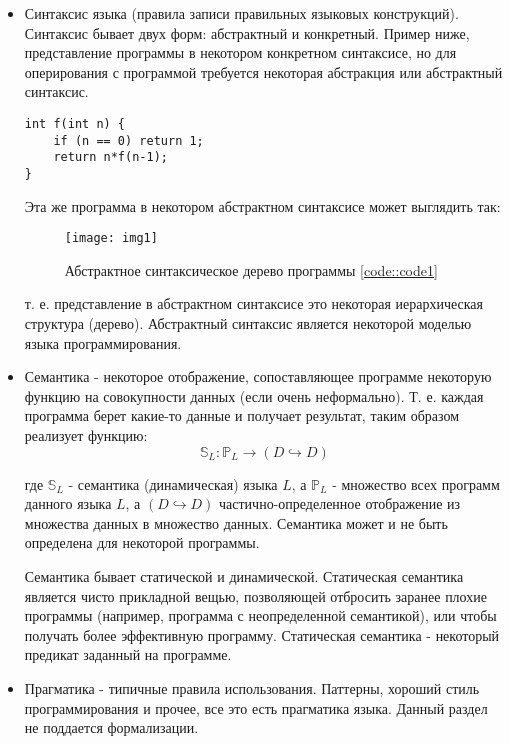 \begin{itemize}
\item Синтаксис языка (правила записи правильных языковых конструкций). Синтаксис бывает двух форм: абстрактный и конкретный. Пример ниже, представление программы в
некотором конкретном синтаксисе, но для оперирования с программой требуется некоторая абстракция или абстрактный синтаксис.

\begin{lstlisting}
int f(int n) {
	if (n == 0) return 1;
	return n*f(n-1);
}
\end{lstlisting}
\label{code::code1}

Эта же программа в некотором абстрактном синтаксисе может выглядить так:

\begin{figure}
\texttt{[image: img1]}
\caption{Абстрактное синтаксическое дерево программы \ref{code::code1}}
\label{img::img1}
\end{figure}

т. е. представление в абстрактном синтаксисе это некоторая иерархическая структура (дерево). Абстрактный синтаксис является некоторой моделью языка
программирования.

\item Семантика - некоторое отображение, сопоставляющее программе некоторую функцию на совокупности данных (если очень неформально). Т. е. каждая программа
берет какие-то данные и получает результат, таким образом реализует функцию: $$ \mathbb{S}_L : \mathbb{P}_L \rightarrow \left(D \hookrightarrow D\right) $$

где $\mathbb{S}_L$ - семантика (динамическая) языка $L$, а $\mathbb{P}_L$ - множество всех программ данного языка $L$, а $\left(D \hookrightarrow D\right)$
частично-определенное отображение из множества данных в множество данных. Семантика может и не быть определена для некоторой программы.

Семантика бывает статической и динамической. Статическая семантика является чисто прикладной вещью, позволяющей отбросить заранее плохие программы (например,
программа с неопределенной семантикой), или чтобы получать более эффективную программу. Статическая семантика - некоторый предикат заданный на программе.

\item Прагматика - типичные правила использования. Паттерны, хороший стиль программирования и прочее, все это есть прагматика языка. Данный раздел не поддается
формализации.
\end{itemize}

